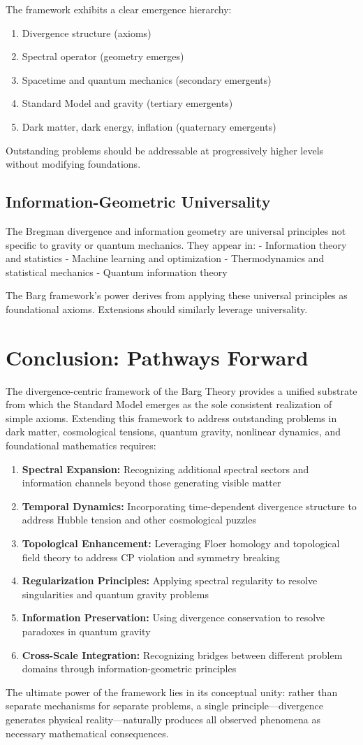 \documentclass[12pt,a4paper]{article}
\begin{document}
The framework exhibits a clear emergence hierarchy:
\begin{enumerate}
\item Divergence structure (axioms)
\item Spectral operator (geometry emerges)
\item Spacetime and quantum mechanics (secondary emergents)
\item Standard Model and gravity (tertiary emergents)
\item Dark matter, dark energy, inflation (quaternary emergents)
\end{enumerate}

Outstanding problems should be addressable at progressively higher levels without modifying foundations.

\subsection{Information-Geometric Universality}

The Bregman divergence and information geometry are universal principles not specific to gravity or quantum mechanics. They appear in:
- Information theory and statistics
- Machine learning and optimization
- Thermodynamics and statistical mechanics
- Quantum information theory

The Barg framework's power derives from applying these universal principles as foundational axioms. Extensions should similarly leverage universality.

\section{Conclusion: Pathways Forward}

The divergence-centric framework of the Barg Theory provides a unified substrate from which the Standard Model emerges as the sole consistent realization of simple axioms. Extending this framework to address outstanding problems in dark matter, cosmological tensions, quantum gravity, nonlinear dynamics, and foundational mathematics requires:

\begin{enumerate}
\item \textbf{Spectral Expansion:} Recognizing additional spectral sectors and information channels beyond those generating visible matter
\item \textbf{Temporal Dynamics:} Incorporating time-dependent divergence structure to address Hubble tension and other cosmological puzzles
\item \textbf{Topological Enhancement:} Leveraging Floer homology and topological field theory to address CP violation and symmetry breaking
\item \textbf{Regularization Principles:} Applying spectral regularity to resolve singularities and quantum gravity problems
\item \textbf{Information Preservation:} Using divergence conservation to resolve paradoxes in quantum gravity
\item \textbf{Cross-Scale Integration:} Recognizing bridges between different problem domains through information-geometric principles
\end{enumerate}

The ultimate power of the framework lies in its conceptual unity: rather than separate mechanisms for separate problems, a single principle---divergence generates physical reality---naturally produces all observed phenomena as necessary mathematical consequences.
\end{document}

